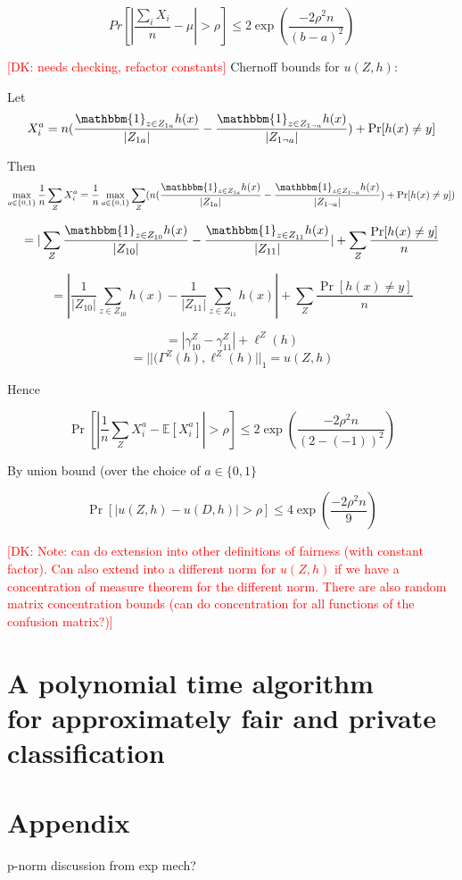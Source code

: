 \documentclass[format = sigconf]{acmart}
\newcommand{\dk}[1]{\textcolor{red}{[DK: #1]}}
\newcommand{\1}{\mathbbm{1}}
\newcommand{\z}[1]{Z_{#1}}
\theoremstyle{definition}
\begin{document}
$$Pr[|\frac{\sum_i X_i}{n} - \mu| > \rho] \leq 2\exp(\frac{-2\rho^2n}{(b-a)^2})$$

\dk {needs checking, refactor constants}
Chernoff bounds for $u(Z,h)$:

Let $$X_i^a = n(\frac{\1_{z\in Z_{1a}}h(x)}{|Z_{1a}|} - \frac{\1_{z\in Z_{1\neg a}}h(x)}{|Z_{1 \neg a}|} ) + \Pr[h(x) \neq y]$$

Then $$\max_{a\in \{0,1\}}\frac{1}{n} \sum_Z X_i^a =\frac{1}{n}  \max_{a\in \{0,1\}} \sum_Z (n(\frac{\1_{z\in Z_{1a}}h(x)}{|Z_{1a}|} - \frac{\1_{z\in Z_{1\neg a}}h(x)}{|Z_{1 \neg a}|} ) + \Pr[h(x) \neq y])$$

$$= |\sum_Z \frac{\1_{z\in \z{10}}h(x)}{|\z{10}|} - \frac{\1_{z\in Z_{11}}h(x)}{|Z_{11}|}| +  \sum_Z \frac{\Pr[h(x) \neq y] }{n}$$

$$= |\frac{1}{|\z{10}|} \sum_{z\in \z{10}} h(x) - \frac{1}{|Z_{11}|} \sum_{z\in Z_{11}} h(x)| +  \sum_Z \frac{\Pr[h(x) \neq y] }{n}$$

$$=|\gamma_{10}^Z - \gamma_{11}^Z| + \ell^Z(h) $$
$$=||(\Gamma^Z(h), \ell^Z(h)||_{1} = u(Z,h)$$

Hence

$$\Pr[|\frac{1}{n} \sum_Z X_i^a - \mathbb{E}[X_i^a]| > \rho] \leq 2\exp(\frac{-2\rho^2n}{(2-(-1))^2})$$

By union bound (over the choice of $a \in \{0,1\}$

$$\Pr[|u(Z,h) - u(D,h)| > \rho] \leq 4\exp(\frac{-2\rho^2n}{9})$$

\dk {Note: can do extension into other definitions of fairness (with constant factor).
	Can also extend into a different norm for $u(Z,h)$ if we have a concentration of measure theorem for the different norm. There are also random matrix concentration bounds (can do concentration for all functions of the confusion matrix?)}

\section{A polynomial time algorithm \\for approximately fair and private classification}


\section{Appendix}
p-norm discussion from exp mech?
\end{document}
